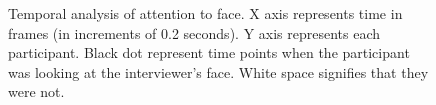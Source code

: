 \documentclass{llncs}
\begin{document}
\begin{figure}
            \hfill
            \hfill
            \centering
        
         \caption{Temporal analysis of attention to face. X axis represents time in frames (in increments of 0.2 seconds). Y axis represents each participant. Black dot represent time points when the participant was looking at the interviewer's face. White space signifies that they were not.}
          \label{fig:sticky}
\end{figure}

\vspace*{-\baselineskip}
\end{document}
